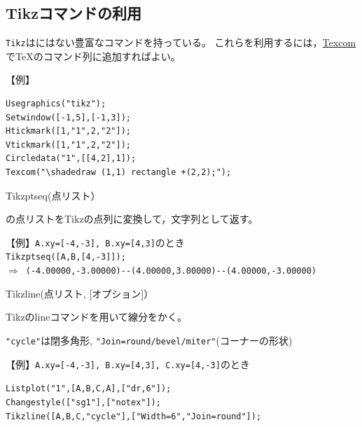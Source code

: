 \documentclass[papersize,a4paper,10pt,uplatex]{jsarticle}
\begin{document}
\subsection{Tikzコマンドの利用}

\hypertarget{tikztexcom}{}

\verb|Tikz|は\ketcindy にはない豊富なコマンドを持っている。
これらを利用するには，\hyperlink{texcom}{Texcom}で\TeX のコマンド列に追加すればよい。

【例】
\begin{verbatim}
Usegraphics("tikz");
Setwindow([-1,5],[-1,3]);
Htickmark([1,"1",2,"2"]);
Vtickmark([1,"1",2,"2"]);
Circledata("1",[[4,2],1]);
Texcom("\shadedraw (1,1) rectangle +(2,2);");
\end{verbatim}

\begin{center}

\end{center}

\begin{description}

\hypertarget{tikzptseq}{}
\item[関数]Tikzptseq(点リスト）
\item[機能]\ketcindy の点リストをTikzの点列に変換して，文字列として返す。

\vspace{3mm}
【例】\verb|A.xy=[-4,-3], B.xy=[4,3]|のとき\\
\hspace*{5mm}\verb|Tikzptseq([A,B,[4,-3]]);|\\
\hspace*{10mm}$\Rightarrow$\ \verb|(-4.00000,-3.00000)--(4.00000,3.00000)--(4.00000,-3.00000)|

\hypertarget{tikzline}{}
\item[関数]Tikzline(点リスト, [オプション]）
\item[機能]Tikzのlineコマンドを用いて線分をかく。
\item[説明]\verb|"cycle"|は閉多角形, \verb|"Join=round/bevel/miter"|(コーナーの形状)

\vspace{3mm}
【例】\verb|A.xy=[-4,-3], B.xy=[4,3], C.xy=[4,-3]|のとき

\hspace*{5mm}\verb|Listplot("1",[A,B,C,A],["dr,6"]);|\\
\hspace*{5mm}\verb|Changestyle(["sg1"],["notex"]);|\\
\hspace*{5mm}\verb|Tikzline([A,B,C,"cycle"],["Width=6","Join=round"]);|

\vspace{-15mm}

\begin{center}
\scalebox{0.5}{}
\end{center}


\end{description}
\end{document}
